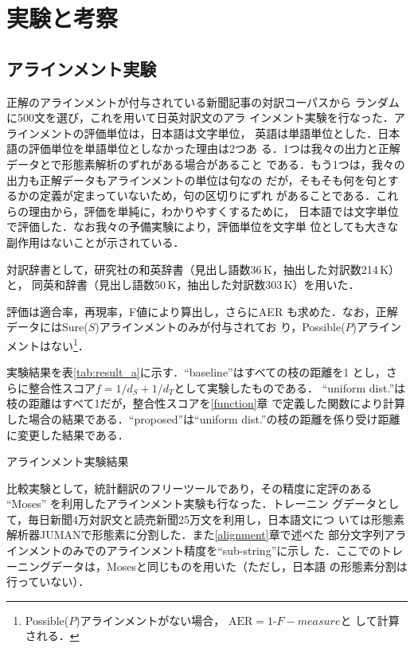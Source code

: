 \documentclass[japanese]{jnlp_1.4}
\begin{document}
\section{実験と考察}
\label{result}

\subsection{アラインメント実験}

正解のアラインメントが付与されている新聞記事の対訳コーパス\cite{Uchimoto04}から
ランダムに500文を選び，これを用いて日英対訳文のアラ
インメント実験を行なった．アラインメントの評価単位は，日本語は文字単位，
英語は単語単位とした．日本語の評価単位を単語単位としなかった理由は2つあ
る．1つは我々の出力と正解データとで形態素解析のずれがある場合があること
である．もう1つは，我々の出力も正解データもアラインメントの単位は句なの
だが，そもそも何を句とするかの定義が定まっていないため，句の区切りにずれ
があることである．これらの理由から，評価を単純に，わかりやすくするために，
日本語では文字単位で評価した．なお我々の予備実験により，評価単位を文字単
位としても大きな副作用はないことが示されている．


対訳辞書として，研究社の和英辞書（見出し語数36\,K，抽出した対訳数214\,K）と，
同英和辞書（見出し語数50\,K，抽出した対訳数303\,K）を用いた．


評価は適合率，再現率，F値により算出し，さらにAER \cite{och00comparison}
も求めた．なお，正解データにはSure($S$)アラインメントのみが付与されてお
り，Possible($P$)アラインメントはない\cite{Och03}\footnote{
	Possible($P$)アラインメントがない場合，
	$\mathrm{AER} = 1\text{-}F-measure$と
	して計算される．
}．


実験結果を表\ref{tab:result_a}に示す．``baseline''はすべての枝の距離を1 
とし，さらに整合性スコア$f=1/d_S+1/d_T$として実験したものである．
``uniform dist.''は枝の距離はすべて1だが，整合性スコアを\ref{function}章
で定義した関数により計算した場合の結果である．``proposed''は``uniform
dist.''の枝の距離を係り受け距離に変更した結果である．

\begin{table}[b]
 \begin{center}
  \caption{アラインメント実験結果}
  \label{tab:result_a}

 \end{center}
\end{table}


比較実験として，統計翻訳のフリーツールであり，その精度に定評のある
``Moses'' \cite{Moses}を利用したアラインメント実験も行なった．トレーニン
グデータとして，毎日新聞4万対訳文と読売新聞25万文を利用し，日本語文につ
いては形態素解析器JUMANで形態素に分割した．また\ref{alignment}章で述べた
部分文字列アラインメントのみでのアラインメント精度を``sub-string''に示し
た．ここでのトレーニングデータは，Mosesと同じものを用いた（ただし，日本語
の形態素分割は行っていない）．
\end{document}
